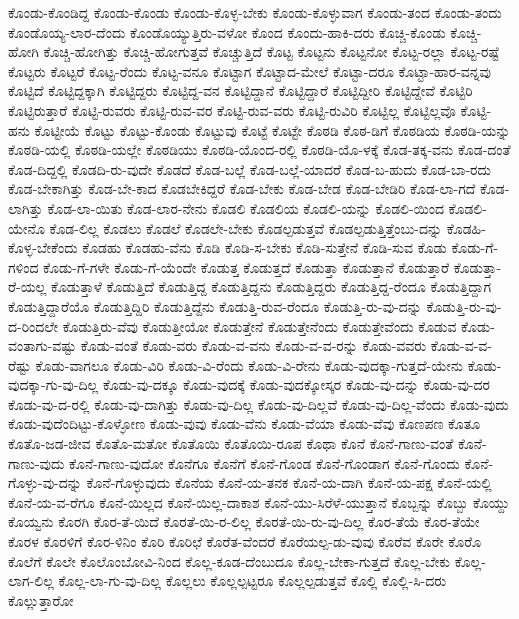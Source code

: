 {ಕೊಂಡು-ಕೊಂಡಿದ್ದ
ಕೊಂಡು-ಕೊಂಡು
ಕೊಂಡು-ಕೊಳ್ಳ-ಬೇಕು
ಕೊಂಡು-ಕೊಳ್ಳುವಾಗ
ಕೊಂಡು-ತಂದ
ಕೊಂಡು-ತಂದು
ಕೊಂಡೊಯ್ಯ-ಲಾರ-ದೆಂದು
ಕೊಂಡೊಯ್ಯುತ್ತಿರು-ವಳೋ
ಕೊಂದ
ಕೊಂದು-ಹಾಕಿ-ದರು
ಕೊಚ್ಚಿ-ಕೊಂಡು
ಕೊಚ್ಚಿ-ಹೋಗಿ
ಕೊಚ್ಚಿ-ಹೋಗಿತ್ತು
ಕೊಚ್ಚಿ-ಹೋಗುತ್ತವೆ
ಕೊಚ್ಚುತ್ತಿದೆ
ಕೊಟ್ಟ
ಕೊಟ್ಟನು
ಕೊಟ್ಟನೋ
ಕೊಟ್ಟ-ರಲ್ಲಾ
ಕೊಟ್ಟ-ರಷ್ಟೆ
ಕೊಟ್ಟರು
ಕೊಟ್ಟರೆ
ಕೊಟ್ಟ-ರೆಂದು
ಕೊಟ್ಟ-ವನೂ
ಕೊಟ್ಟಾಗ
ಕೊಟ್ಟಾದ-ಮೇಲೆ
ಕೊಟ್ಟಾ-ದರೂ
ಕೊಟ್ಟಾ-ಹಾರ-ವನ್ನವು
ಕೊಟ್ಟಿದೆ
ಕೊಟ್ಟಿದ್ದಕ್ಕಾಗಿ
ಕೊಟ್ಟಿದ್ದರು
ಕೊಟ್ಟಿದ್ದ-ವನ
ಕೊಟ್ಟಿದ್ದಾನೆ
ಕೊಟ್ಟಿದ್ದಾರೆ
ಕೊಟ್ಟಿದ್ದೀರಿ
ಕೊಟ್ಟಿದ್ದೇವೆ
ಕೊಟ್ಟಿರಿ
ಕೊಟ್ಟಿರುತ್ತಾರೆ
ಕೊಟ್ಟಿ-ರುವರು
ಕೊಟ್ಟಿ-ರುವ-ವರ
ಕೊಟ್ಟಿ-ರುವ-ವರು
ಕೊಟ್ಟಿ-ರುವಿರಿ
ಕೊಟ್ಟಿಲ್ಲ
ಕೊಟ್ಟಿಲ್ಲವೊ
ಕೊಟ್ಟಿ-ಹನು
ಕೊಟ್ಟೀಯೆ
ಕೊಟ್ಟು
ಕೊಟ್ಟು-ಕೊಂಡು
ಕೊಟ್ಟುವು
ಕೊಟ್ಟೆ
ಕೊಟ್ಟೇ
ಕೊಠಡಿ
ಕೊಠ-ಡಿಗೆ
ಕೊಠಡಿಯ
ಕೊಠಡಿ-ಯನ್ನು
ಕೊಠಡಿ-ಯಲ್ಲಿ
ಕೊಠಡಿ-ಯಲ್ಲೇ
ಕೊಠಡಿಯು
ಕೊಠಡಿ-ಯೊಂದ-ರಲ್ಲಿ
ಕೊಠಡಿ-ಯೊ-ಳಕ್ಕೆ
ಕೊಡ-ತಕ್ಕ-ವನು
ಕೊಡ-ದಂತೆ
ಕೊಡ-ದಿದ್ದಲ್ಲಿ
ಕೊಡದಿ-ರು-ವುದೇ
ಕೊಡದೆ
ಕೊಡ-ಬಲ್ಲೆ
ಕೊಡ-ಬಲ್ಲೆ-ಯಾದರೆ
ಕೊಡ-ಬ-ಹುದು
ಕೊಡ-ಬಾ-ರದು
ಕೊಡ-ಬೇಕಾಗಿತ್ತು
ಕೊಡ-ಬೇ-ಕಾದ
ಕೊಡಬೇಕಿದ್ದರೆ
ಕೊಡ-ಬೇಕು
ಕೊಡ-ಬೇಡ
ಕೊಡ-ಬೇಡಿರಿ
ಕೊಡ-ಲಾ-ಗದೆ
ಕೊಡ-ಲಾಗಿತ್ತು
ಕೊಡ-ಲಾ-ಯಿತು
ಕೊಡ-ಲಾರ-ನೇನು
ಕೊಡಲಿ
ಕೊಡಲಿಯ
ಕೊಡಲಿ-ಯನ್ನು
ಕೊಡಲಿ-ಯಿಂದ
ಕೊಡಲಿ-ಯೇನೊ
ಕೊಡ-ಲಿಲ್ಲ
ಕೊಡಲು
ಕೊಡಲೆ
ಕೊಡಲೇ-ಬೇಕು
ಕೊಡಲ್ಪಡುತ್ತವೆ
ಕೊಡಲ್ಪಡುತ್ತಿತ್ತೆಂಬು-ದನ್ನು
ಕೊಡಹಿ-ಕೊಳ್ಳ-ಬೇಕೆಂದು
ಕೊಡಹು
ಕೊಡಹು-ವೆನು
ಕೊಡಿ
ಕೊಡಿ-ಸ-ಬೇಕು
ಕೊಡಿ-ಸುತ್ತೇನೆ
ಕೊಡಿ-ಸುವ
ಕೊಡು
ಕೊಡು-ಗೆ-ಗಳಿಂದ
ಕೊಡು-ಗೆ-ಗಳೇ
ಕೊಡು-ಗೆ-ಯೆಂದೇ
ಕೊಡುತ್ತ
ಕೊಡುತ್ತದೆ
ಕೊಡುತ್ತಾ
ಕೊಡುತ್ತಾನೆ
ಕೊಡುತ್ತಾರೆ
ಕೊಡುತ್ತಾ-ರೆ-ಯಲ್ಲ
ಕೊಡುತ್ತಾಳೆ
ಕೊಡುತ್ತಿದೆ
ಕೊಡುತ್ತಿದ್ದ
ಕೊಡುತ್ತಿದ್ದನು
ಕೊಡುತ್ತಿದ್ದರು
ಕೊಡುತ್ತಿದ್ದ-ರೆಂದೂ
ಕೊಡುತ್ತಿದ್ದಾಗ
ಕೊಡುತ್ತಿದ್ದಾರೆಯೊ
ಕೊಡುತ್ತಿದ್ದಿರಿ
ಕೊಡುತ್ತಿದ್ದೆನು
ಕೊಡುತ್ತಿ-ರುವ-ರೆಂದೂ
ಕೊಡುತ್ತಿ-ರು-ವು-ದನ್ನು
ಕೊಡುತ್ತಿ-ರು-ವು-ದ-ರಿಂದಲೇ
ಕೊಡುತ್ತಿರು-ವೆವು
ಕೊಡುತ್ತೀಯೋ
ಕೊಡುತ್ತೇನೆ
ಕೊಡುತ್ತೇನೆಂದು
ಕೊಡುತ್ತೇವೆಂದು
ಕೊಡುವ
ಕೊಡು-ವಂತಾಗು-ವಷ್ಟು
ಕೊಡು-ವಂತೆ
ಕೊಡು-ವರು
ಕೊಡು-ವ-ವನು
ಕೊಡು-ವ-ವ-ರನ್ನು
ಕೊಡು-ವವರು
ಕೊಡು-ವ-ವ-ರೆಷ್ಟು
ಕೊಡು-ವಾಗಲೂ
ಕೊಡು-ವಿರಿ
ಕೊಡು-ವಿ-ರೆಂದು
ಕೊಡು-ವಿ-ರೇನು
ಕೊಡು-ವುದಕ್ಕಾ-ಗುತ್ತದೆ-ಯೇನು
ಕೊಡು-ವುದಕ್ಕಾ-ಗು-ವು-ದಿಲ್ಲ
ಕೊಡು-ವು-ದಕ್ಕೂ
ಕೊಡು-ವುದಕ್ಕೆ
ಕೊಡು-ವುದಕ್ಕೋಸ್ಕರ
ಕೊಡು-ವು-ದನ್ನು
ಕೊಡು-ವು-ದರ
ಕೊಡು-ವು-ದ-ರಲ್ಲಿ
ಕೊಡು-ವು-ದಾಗಿತ್ತು
ಕೊಡು-ವು-ದಿಲ್ಲ
ಕೊಡು-ವು-ದಿಲ್ಲವೆ
ಕೊಡು-ವು-ದಿಲ್ಲ-ವೆಂದು
ಕೊಡು-ವುದು
ಕೊಡು-ವುದೆಂದಿಟ್ಟು-ಕೊಳ್ಳೋಣ
ಕೊಡು-ವುವು
ಕೊಡು-ವೆನು
ಕೊಡು-ವೆಯಾ
ಕೊಡು-ವೆವು
ಕೊಣಪಣ
ಕೊತೂ
ಕೊತೊ-ಜಡ-ಜೀವ
ಕೊತೊ-ಮತೋ
ಕೊತೊಯಿ
ಕೊತೊಯಿ-ರೂಪ
ಕೊಥಾ
ಕೊನೆ
ಕೊನೆ-ಗಾಣು-ವಂತೆ
ಕೊನೆ-ಗಾಣು-ವುದು
ಕೊನೆ-ಗಾಣು-ವುದೋ
ಕೊನೆಗೂ
ಕೊನೆಗೆ
ಕೊನೆ-ಗೊಂಡ
ಕೊನೆ-ಗೊಂಡಾಗ
ಕೊನೆ-ಗೊಂದು
ಕೊನೆ-ಗೊಳ್ಳು-ವು-ದನ್ನು
ಕೊನೆ-ಗೊಳ್ಳುವುದು
ಕೊನೆಯ
ಕೊನೆ-ಯ-ತನಕ
ಕೊನೆ-ಯ-ದಾಗಿ
ಕೊನೆ-ಯ-ಪಕ್ಷ
ಕೊನೆ-ಯಲ್ಲಿ
ಕೊನೆ-ಯ-ವ-ರೆಗೂ
ಕೊನೆ-ಯಿಲ್ಲದ
ಕೊನೆ-ಯಿಲ್ಲ-ದಾಕಾಶ
ಕೊನೆ-ಯು-ಸಿರೆಳೆ-ಯುತ್ತಾನೆ
ಕೊಬ್ಬನ್ನು
ಕೊಬ್ಬು
ಕೊಯ್ದು
ಕೊಯ್ವನು
ಕೊರಗಿ
ಕೊರ-ತೆ-ಯಿದೆ
ಕೊರತೆ-ಯಿ-ರ-ಲಿಲ್ಲ
ಕೊರತೆ-ಯಿ-ರು-ವು-ದಿಲ್ಲ
ಕೊರ-ತೆಯೆ
ಕೊರ-ತೆಯೇ
ಕೊರಳ
ಕೊರಳಿಗೆ
ಕೊರ-ಳಿನಿಂ
ಕೊರಿ
ಕೊರಿಛೆ
ಕೊರೆತ-ವೆಂದರೆ
ಕೊರೆಯಲ್ಪ-ಡು-ವುವು
ಕೊರೆವ
ಕೊರೇ
ಕೊರೊ
ಕೊಲೆಗೆ
ಕೊಲೇ
ಕೊಲೊಂಬೋವಿ-ನಿಂದ
ಕೊಲ್ಲ-ಕೂಡ-ದೆಂಬುದೂ
ಕೊಲ್ಲ-ಬೇಕಾ-ಗುತ್ತದೆ
ಕೊಲ್ಲ-ಬೇಕು
ಕೊಲ್ಲ-ಲಾಗ-ಲಿಲ್ಲ
ಕೊಲ್ಲ-ಲಾ-ಗು-ವು-ದಿಲ್ಲ
ಕೊಲ್ಲಲು
ಕೊಲ್ಲಲ್ಪಟ್ಟರೂ
ಕೊಲ್ಲಲ್ಪಡುತ್ತವೆ
ಕೊಲ್ಲಿ
ಕೊಲ್ಲಿ-ಸಿ-ದರು
ಕೊಲ್ಲುತ್ತಾರೋ
}
